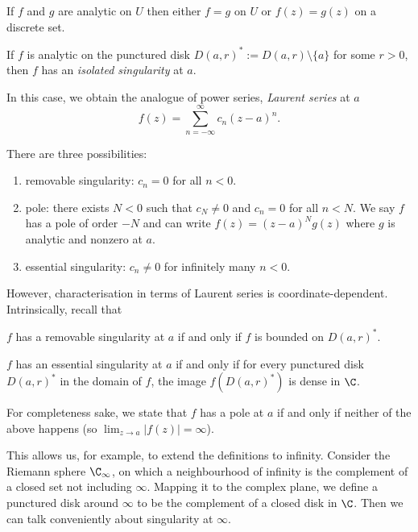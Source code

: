 \documentclass[a4paper]{article}
\begin{document}
\begin{corollary}
  If \(f\) and \(g\) are analytic on \(U\) then either \(f = g\) on \(U\) or \(f(z) = g(z)\) on a discrete set.
\end{corollary}

\begin{definition}
  If \(f\) is analytic on the punctured disk \(D(a, r)^* := D(a, r) \setminus \{a\}\) for some \(r > 0\), then \(f\) has an \emph{isolated singularity} at \(a\).
\end{definition}

In this case, we obtain the analogue of power series, \emph{Laurent series} at \(a\)
\[
  f(z) = \sum_{n = -\infty}^{\infty} c_n (z - a)^n.
\]

There are three possibilities:
\begin{enumerate}
\item removable singularity: \(c_n = 0\) for all \(n < 0\).
\item pole: there exists \(N < 0\) such that \(c_N \neq 0\) and \(c_n = 0\) for all \(n < N\). We say \(f\) has a pole of order \(-N\) and can write \(f(z) = (z - a)^N g(z)\) where \(g\) is analytic and nonzero at \(a\).
\item essential singularity: \(c_n \neq 0\) for infinitely many \(n < 0\).
\end{enumerate}

However, characterisation in terms of Laurent series is coordinate-dependent. Intrinsically, recall that

\begin{theorem}
  \(f\) has a removable singularity at \(a\) if and only if \(f\) is bounded on \(D(a, r)^*\).
\end{theorem}

\begin{theorem}
  \(f\) has an essential singularity at \(a\) if and only if for every punctured disk \(D(a, r)^*\) in the domain of \(f\), the image \(f(D(a, r)^*)\) is dense in \(\C\).
\end{theorem}

For completeness sake, we state that \(f\) has a pole at \(a\) if and only if neither of the above happens (so \(\lim_{z \to a} |f(z)| = \infty\)).

This allows us, for example, to extend the definitions to infinity. Consider the Riemann sphere \(\C_\infty\), on which a neighbourhood of infinity is the complement of a closed set not including \(\infty\). Mapping it to the complex plane, we define a punctured disk around \(\infty\) to be the complement of a closed disk in \(\C\). Then we can talk conveniently about singularity at \(\infty\).
\end{document}
